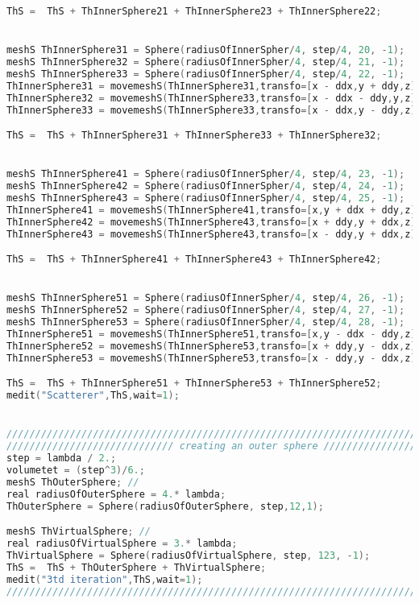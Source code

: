 \begin{lstlisting}[language=C]
ThS =  ThS + ThInnerSphere21 + ThInnerSphere23 + ThInnerSphere22;


meshS ThInnerSphere31 = Sphere(radiusOfInnerSpher/4, step/4, 20, -1);
meshS ThInnerSphere32 = Sphere(radiusOfInnerSpher/4, step/4, 21, -1);
meshS ThInnerSphere33 = Sphere(radiusOfInnerSpher/4, step/4, 22, -1);
ThInnerSphere31 = movemeshS(ThInnerSphere31,transfo=[x - ddx,y + ddy,z]);
ThInnerSphere32 = movemeshS(ThInnerSphere33,transfo=[x - ddx - ddy,y,z]);
ThInnerSphere33 = movemeshS(ThInnerSphere33,transfo=[x - ddx,y - ddy,z]);

ThS =  ThS + ThInnerSphere31 + ThInnerSphere33 + ThInnerSphere32;


meshS ThInnerSphere41 = Sphere(radiusOfInnerSpher/4, step/4, 23, -1);
meshS ThInnerSphere42 = Sphere(radiusOfInnerSpher/4, step/4, 24, -1);
meshS ThInnerSphere43 = Sphere(radiusOfInnerSpher/4, step/4, 25, -1);
ThInnerSphere41 = movemeshS(ThInnerSphere41,transfo=[x,y + ddx + ddy,z]);
ThInnerSphere42 = movemeshS(ThInnerSphere43,transfo=[x + ddy,y + ddx,z]);
ThInnerSphere43 = movemeshS(ThInnerSphere43,transfo=[x - ddy,y + ddx,z]);

ThS =  ThS + ThInnerSphere41 + ThInnerSphere43 + ThInnerSphere42;


meshS ThInnerSphere51 = Sphere(radiusOfInnerSpher/4, step/4, 26, -1);
meshS ThInnerSphere52 = Sphere(radiusOfInnerSpher/4, step/4, 27, -1);
meshS ThInnerSphere53 = Sphere(radiusOfInnerSpher/4, step/4, 28, -1);
ThInnerSphere51 = movemeshS(ThInnerSphere51,transfo=[x,y - ddx - ddy,z]);
ThInnerSphere52 = movemeshS(ThInnerSphere53,transfo=[x + ddy,y - ddx,z]);
ThInnerSphere53 = movemeshS(ThInnerSphere53,transfo=[x - ddy,y - ddx,z]);

ThS =  ThS + ThInnerSphere51 + ThInnerSphere53 + ThInnerSphere52;
medit("Scatterer",ThS,wait=1);


//////////////////////////////////////////////////////////////////////////////////////////////
///////////////////////////// creating an outer sphere ///////////////////////////////////////
step = lambda / 2.;
volumetet = (step^3)/6.;  
meshS ThOuterSphere; // 
real radiusOfOuterSphere = 4.* lambda;
ThOuterSphere = Sphere(radiusOfOuterSphere, step,12,1);

meshS ThVirtualSphere; // 
real radiusOfVirtualSphere = 3.* lambda;
ThVirtualSphere = Sphere(radiusOfVirtualSphere, step, 123, -1);
ThS =  ThS + ThOuterSphere + ThVirtualSphere;
medit("3td iteration",ThS,wait=1);
/////////////////////////////////////////////////////////////////////////////


\end{lstlisting}
